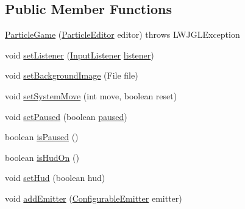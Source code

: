 \subsection*{Public Member Functions}
\begin{DoxyCompactItemize}
\item 
\mbox{\hyperlink{classorg_1_1newdawn_1_1slick_1_1tools_1_1peditor_1_1_particle_game_abc250ace33dcf2289215416525d9b890}{Particle\+Game}} (\mbox{\hyperlink{classorg_1_1newdawn_1_1slick_1_1tools_1_1peditor_1_1_particle_editor}{Particle\+Editor}} editor)  throws L\+W\+J\+G\+L\+Exception 
\item 
void \mbox{\hyperlink{classorg_1_1newdawn_1_1slick_1_1tools_1_1peditor_1_1_particle_game_af9fefc9bcbfbb9fe305f823dd7052207}{set\+Listener}} (\mbox{\hyperlink{interfaceorg_1_1newdawn_1_1slick_1_1_input_listener}{Input\+Listener}} \mbox{\hyperlink{classorg_1_1newdawn_1_1slick_1_1tools_1_1peditor_1_1_particle_game_a53d1d501b82579d73d73b49f5a793b84}{listener}})
\item 
void \mbox{\hyperlink{classorg_1_1newdawn_1_1slick_1_1tools_1_1peditor_1_1_particle_game_a081aedf0b9add8b9ef26cc2d19da7176}{set\+Background\+Image}} (File file)
\item 
void \mbox{\hyperlink{classorg_1_1newdawn_1_1slick_1_1tools_1_1peditor_1_1_particle_game_ab80789f63417c1a3b58bb9f487f0f876}{set\+System\+Move}} (int move, boolean reset)
\item 
void \mbox{\hyperlink{classorg_1_1newdawn_1_1slick_1_1tools_1_1peditor_1_1_particle_game_a4f57bbbd2865e3b9571ffc3f2b4ac46e}{set\+Paused}} (boolean \mbox{\hyperlink{classorg_1_1newdawn_1_1slick_1_1tools_1_1peditor_1_1_particle_game_a5023ac0e8141513700ff26420c592211}{paused}})
\item 
boolean \mbox{\hyperlink{classorg_1_1newdawn_1_1slick_1_1tools_1_1peditor_1_1_particle_game_a8eb47c41d8633e1703884537ceb2a8ae}{is\+Paused}} ()
\item 
boolean \mbox{\hyperlink{classorg_1_1newdawn_1_1slick_1_1tools_1_1peditor_1_1_particle_game_a49891c5406fff772ff3c1112c8341f52}{is\+Hud\+On}} ()
\item 
void \mbox{\hyperlink{classorg_1_1newdawn_1_1slick_1_1tools_1_1peditor_1_1_particle_game_a73351b1cf03336ce2375629ba36af5f7}{set\+Hud}} (boolean hud)
\item 
void \mbox{\hyperlink{classorg_1_1newdawn_1_1slick_1_1tools_1_1peditor_1_1_particle_game_ad0dcd4c71df78c3bbdc5cf2a8bcca2e0}{add\+Emitter}} (\mbox{\hyperlink{classorg_1_1newdawn_1_1slick_1_1particles_1_1_configurable_emitter}{Configurable\+Emitter}} emitter)

\end{DoxyCompactItemize}
